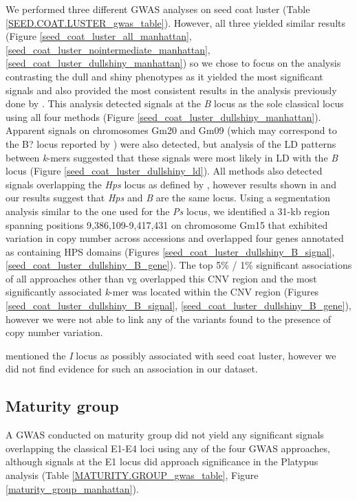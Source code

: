We performed three different GWAS analyses on seed coat luster (Table
\ref{SEED.COAT.LUSTER_gwas_table}).  However, all three yielded similar results
(Figure \ref{seed_coat_luster_all_manhattan},
\ref{seed_coat_luster_nointermediate_manhattan},
\ref{seed_coat_luster_dullshiny_manhattan}) so we chose to focus on the
analysis contrasting the dull and shiny phenotypes as it yielded the most
significant signals and also provided the most consistent results in the
analysis previously done by \cite{bandillo2017}. This analysis detected
signals at the \emph{B} locus as the sole classical locus using all four
methods (Figure \ref{seed_coat_luster_dullshiny_manhattan}). Apparent signals
on chromosomes Gm20 and Gm09 (which may correspond to the B? locus reported by
\cite{bandillo2017}) were also detected, but analysis of the LD patterns
between \emph{k}-mers suggested that these signals were most likely in LD with
the \emph{B} locus (Figure \ref{seed_coat_luster_dullshiny_ld}). All methods
also detected signals overlapping the \emph{Hps} locus as defined by
\cite{bandillo2017}, however results shown in \cite{gijzen2003} and our results
suggest that \emph{Hps} and \emph{B} are the same locus. Using a segmentation analysis
similar to the one used for the \emph{Ps} locus, we identified a 31-kb region
spanning positions 9,386,109-9,417,431 on chromosome Gm15 that exhibited
variation in copy number across accessions and overlapped four genes annotated
as containing HPS domains (Figures \ref{seed_coat_luster_dullshiny_B_signal},
\ref{seed_coat_luster_dullshiny_B_gene}). The top 5\% / 1\% significant
associations of all approaches other than vg overlapped this CNV region and the
most significantly associated \emph{k}-mer was located within the CNV region
(Figures \ref{seed_coat_luster_dullshiny_B_signal},
\ref{seed_coat_luster_dullshiny_B_gene}), however we were not able to link any
of the variants found to the presence of copy number variation.


\cite{bandillo2017} mentioned the \textit{I} locus as possibly associated
with seed coat luster, however we did not find evidence for such an association
in our dataset.

\subsection*{Maturity group}
\label{sv-gwas-maturity-group}

A GWAS conducted on maturity group did not yield any significant signals
overlapping the classical E1-E4 loci using any of the four GWAS approaches,
although signals at the E1 locus did approach significance in the Platypus
analysis (Table \ref{MATURITY.GROUP_gwas_table}, Figure \ref{maturity_group_manhattan}).

